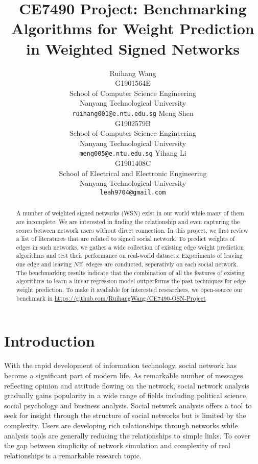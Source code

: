 \documentclass{article}
\title{CE7490 Project: Benchmarking Algorithms for Weight Prediction in Weighted Signed Networks}
\author{
  Ruihang Wang\\
  G1901564E\\
  School of Computer Science Engineering\\
  Nanyang Technological University\\
  \texttt{ruihang001@e.ntu.edu.sg} 
  \And
  Meng Shen\\
  G1902579B\\
  School of Computer Science Engineering\\
  Nanyang Technological University\\
  \texttt{meng005@e.ntu.edu.sg}
  \And
  Yihang Li\\
  G1901408C\\
  School of Electrical and Electronic Engineering\\
  Nanyang Technological University\\
  \texttt{leah9704@gmail.com}
}
\begin{document}
\maketitle

\begin{abstract}
  A number of weighted signed networks (WSN) exist in our world while 
  many of them are incomplete. We are interested in finding the relationship
  and even capturing the scores between network users without direct connection.
  In this project, we first review a list of literatures that are
  related to signed social network. To predict weights of edges in 
  such networks, we gather a wide collection of existing edge weight
  prediction algorithms and test their performance on real-world datasets.
  Experiments of leaving one edge and leaving $N\%$ edeges are conducted,
  seperativly on each social network. The benchmarking results indicate
  that the combination of all the features of existing algorithms to learn
  a linear regression model outperforms the past techniques for edge weight
  prediction. To make it avaliable for interested researchers, we open-source our benchmark in 
  \url{https://github.com/RuihangWang/CE7490-OSN-Project}
\end{abstract}

\section{Introduction}

With the rapid development of information technology, social 
network has become a significant part of modern life. As 
remarkable number of messages reflecting opinion and attitude 
flowing on the network, social network analysis gradually gains 
popularity in a wide range of fields including political 
science, social psychology and business analysis. Social 
network analysis offers a tool to seek for insight through 
the structure of social networks but is limited by the 
complexity. Users are developing rich relationships through 
networks while analysis tools are generally reducing the 
relationships to simple links. To cover the gap between 
simplicity of network simulation and complexity of real 
relationships is a remarkable research topic. 
\end{document}

